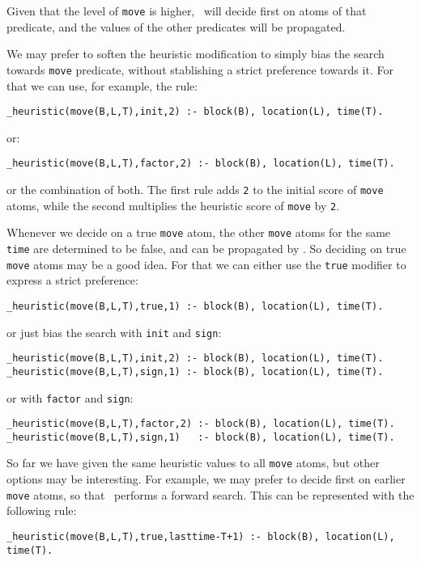 Given that the level of \texttt{move} is higher,  \clasp\ will decide first on atoms of that predicate,
and the values of the other predicates will be propagated.

We may prefer to soften the heuristic modification to simply bias the search  towards \texttt{move} predicate,
without stablishing a strict preference towards it.  For that we can use, for example, the rule:
\begin{verbatim}
_heuristic(move(B,L,T),init,2) :- block(B), location(L), time(T).\end{verbatim} or:
\begin{verbatim}
_heuristic(move(B,L,T),factor,2) :- block(B), location(L), time(T).\end{verbatim}

or the combination of both.  The first rule adds \texttt{2} to the initial score of \texttt{move} atoms,
while the second multiplies the heuristic score of \texttt{move} by \texttt{2}.

Whenever we decide on a true \texttt{move} atom,  the other \texttt{move} atoms for the same \texttt{time} are determined to be false,
and can be propagated by \clasp. So deciding on true \texttt{move} atoms may be a good idea.
For that we can either use the \texttt{true} modifier to express a strict preference:
\begin{verbatim}
_heuristic(move(B,L,T),true,1) :- block(B), location(L), time(T).\end{verbatim}

or just bias the search with \texttt{init} and \texttt{sign}:
\begin{verbatim}
_heuristic(move(B,L,T),init,2) :- block(B), location(L), time(T).
_heuristic(move(B,L,T),sign,1) :- block(B), location(L), time(T).\end{verbatim}

or with \texttt{factor} and \texttt{sign}:
\begin{verbatim}
_heuristic(move(B,L,T),factor,2) :- block(B), location(L), time(T).
_heuristic(move(B,L,T),sign,1)   :- block(B), location(L), time(T).\end{verbatim}



So far we have given the same heuristic values to all \texttt{move} atoms,
but other options may be interesting. For example, we may prefer to decide first on earlier \texttt{move} atoms,
so that \clasp\ performs a forward search. This can be represented with the following rule:
\begin{verbatim}
_heuristic(move(B,L,T),true,lasttime-T+1) :- block(B), location(L), time(T).\end{verbatim}

